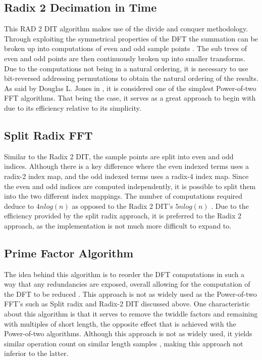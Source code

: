 \documentclass[journal]{IEEEtran}
\begin{document}
	\subsection{Radix 2 Decimation in Time}
		\par{
			This RAD 2 DIT algorithm makes use of the divide and conquer methodology. Through exploiting 
			the symmetrical properties of the DFT the summation can be broken up into computations of even 
			and odd sample points \cite{Soni}. The sub trees of even and odd points are then continuously 
			broken up into smaller transforms. Due to the computations not being in a natural ordering,
			it is necessary to use bit-reversed addressing permutations to obtain the natural ordering of the results. As said by 
			Douglas L. Jones in \cite{Cnx}, it is considered one of the simplest Power-of-two FFT algorithms. 
			That being the case, it serves as a great approach to begin with due to its efficiency relative to 
			its simplicity.
		}
	\subsection{Split Radix FFT}
		\par{
			Similar to the Radix 2 DIT, the sample points are split into even and odd indices. Although there is 
			a key difference where the even indexed terms uses a radix-2 index map, and the odd indexed terms uses 
			a radix-4 index map. Since the even and odd indices are computed independently, it is possible to split 
			them into the two different index mappings. The number of computations required deduce to ${4n log(n)}$ 
			as opposed to the Radix 2 DIT's ${5n log(n)}$ \cite{Soni}. Due to the efficiency provided by the split 
			radix approach, it is preferred to the Radix 2 approach, as the implementation is not much more difficult 
			to expand to.
		}

	\subsection{Prime Factor Algorithm}
		\par{
			The idea behind this algorithm is to reorder the DFT computations in such a way that any redundancies 
			are exposed, overall allowing for the computation of the DFT to be reduced \cite{Cnx}. 
			This approach is not as widely used as the Power-of-two FFT's such as Split radix and Radix-2 DIT discussed above. 
			One characteristic about this algorithm is that it serves to remove the twiddle factors and remaining with multiples 
			of short length, the opposite effect that is achieved with the Power-of-two algorithms. Although this approach is not 
			as widely used, it yields similar operation count on similar length samples \cite{Cnx}, making this approach not 
			inferior to the latter.
		}
\end{document}
